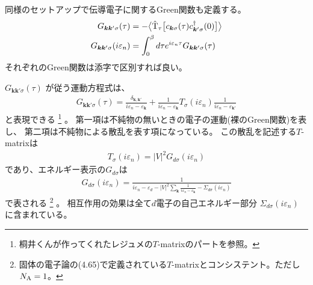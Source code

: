 \documentclass[a4j]{jarticle}
\begin{document}
同様のセットアップで伝導電子に関するGreen関数も定義する。
\begin{align}
	G_{\bm{k}\bm{k}' \sigma}(\tau)
	 & =
	-
	\big\langle
	{\rm \hat{T}}_{\tau}
	\big[
		c_{\bm{k} \sigma}(\tau)
		c_{\bm{k}' \sigma}^{\dagger}(0)
		\big]
	\big\rangle
	\\
	G_{\bm{k}\bm{k}' \sigma}(i \varepsilon_{n})
	 & =
	\int^{\beta}_{0}
	d\tau
	e^{i \varepsilon_{n} \tau}
	G_{\bm{k}\bm{k}' \sigma}(\tau)
\end{align}
それぞれのGreen関数は添字で区別すれば良い。

$G_{\bm{k}\bm{k}' \sigma}(\tau)$
が従う運動方程式は、
\begin{align}
	G_{\bm{k}\bm{k}' \sigma}(\tau)
	=
	\frac{\delta_{\bm{k},\bm{k}'}}{
		i \varepsilon_{n} - \varepsilon_{\bm{k}}
	}
	+
	\frac{1}{
		i \varepsilon_{n} - \varepsilon_{\bm{k}}
	}
	T_{\sigma}(i \varepsilon_{n})
	\frac{1}{
		i \varepsilon_{n} - \varepsilon_{\bm{k}'}
	}
\end{align}
と表現できる
\footnote{
	桐井くんが作ってくれたレジュメの$T$-matrixのパートを参照。
}
。
第一項は不純物の無いときの電子の運動(裸のGreen関数)を表し、
第二項は不純物による散乱を表す項になっている。
この散乱を記述する$T$-matrixは
\begin{align}
	T_{\sigma}(i \varepsilon_{n})
	=
	|V|^{2}
	G_{d \sigma}(i \varepsilon_{n})
\end{align}
であり、エネルギー表示の$G_{d \sigma}$は
\begin{align}
	G_{d \sigma}(i \varepsilon_{n})
	=
	\frac{1}{
		\displaystyle
		i \varepsilon_{n}
		-
		\varepsilon_{d}
		-
		|V|^{2}
		\displaystyle
		\sum_{\bm{k}}
		\frac{1}{
			i \varepsilon_{n} - \varepsilon_{\bm{k}}
		}
		-
		\Sigma_{d\sigma}(i \varepsilon_{n})
	}
\end{align}
で表される
\footnote{
	固体の電子論の(4.65)で定義されている$T$-matrixとコンシステント。ただし$N_{\rm A}=1$。
}
。
相互作用の効果は全て$d$電子の自己エネルギー部分
$\Sigma_{d\sigma}(i \varepsilon_{n})$
に含まれている。
\end{document}
